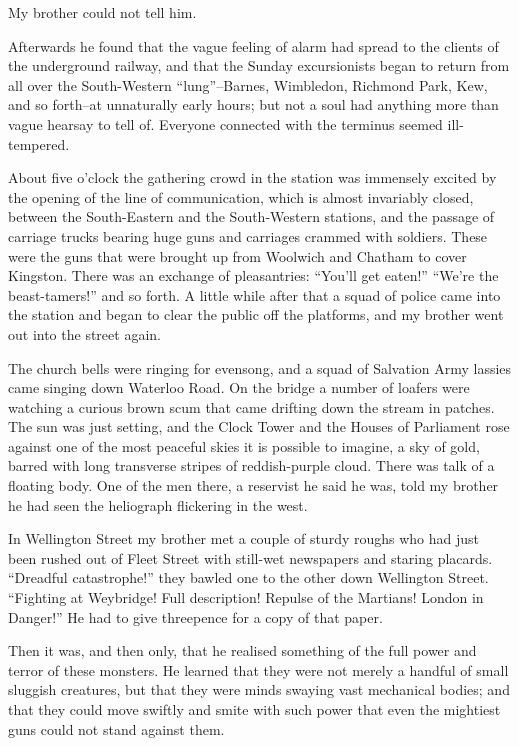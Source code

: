 My brother could not tell him.

Afterwards he found that the vague feeling of alarm had spread to
the clients of the underground railway, and that the Sunday
excursionists began to return from all over the South-Western
``lung''--Barnes, Wimbledon, Richmond Park, Kew, and so forth--at
unnaturally early hours; but not a soul had anything more than
vague hearsay to tell of. Everyone connected with the terminus
seemed ill-tempered.

About five o'clock the gathering crowd in the station was immensely
excited by the opening of the line of communication, which is
almost invariably closed, between the South-Eastern and the
South-Western stations, and the passage of carriage trucks bearing
huge guns and carriages crammed with soldiers. These were the guns
that were brought up from Woolwich and Chatham to cover Kingston.
There was an exchange of pleasantries: ``You'll get eaten!'' ``We're
the beast-tamers!'' and so forth. A little while after that a squad
of police came into the station and began to clear the public off
the platforms, and my brother went out into the street again.

The church bells were ringing for evensong, and a squad of
Salvation Army lassies came singing down Waterloo Road. On the
bridge a number of loafers were watching a curious brown scum that
came drifting down the stream in patches. The sun was just setting,
and the Clock Tower and the Houses of Parliament rose against one
of the most peaceful skies it is possible to imagine, a sky of
gold, barred with long transverse stripes of reddish-purple cloud.
There was talk of a floating body. One of the men there, a
reservist he said he was, told my brother he had seen the
heliograph flickering in the west.

In Wellington Street my brother met a couple of sturdy roughs who
had just been rushed out of Fleet Street with still-wet newspapers
and staring placards. ``Dreadful catastrophe!'' they bawled one to
the other down Wellington Street. ``Fighting at Weybridge! Full
description! Repulse of the Martians! London in Danger!'' He had to
give threepence for a copy of that paper.

Then it was, and then only, that he realised something of the full
power and terror of these monsters. He learned that they were not
merely a handful of small sluggish creatures, but that they were
minds swaying vast mechanical bodies; and that they could move
swiftly and smite with such power that even the mightiest guns
could not stand against them.

